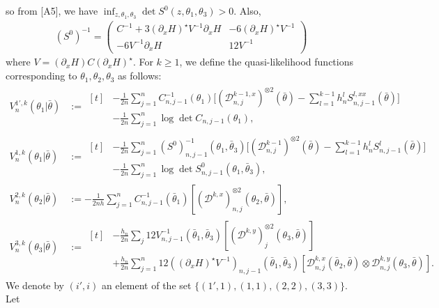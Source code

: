 \documentclass[a4paper,11pt]{jsarticle}
\begin{document}
so from [A5], we have $\inf_{z,\theta_1,\theta_3} \det S^0(z,\theta_1,\theta_3)>0$. Also,
\begin{align}
    (S^0)^{-1} =   \begin{pmatrix}
        C^{-1}  + 3( \partial_x H)^\star V^{-1}\partial_x H & -6 (\partial_x H)^\star V^{-1} \\ -6 V^{-1} \partial_x H & 12 V^{-1}
    \end{pmatrix}
\end{align}
where $    V = (\partial_x H) C (\partial_x H)^\star $. For $k \geq 1$, we define the quasi-likelihood functions corresponding to $\theta_1,\theta_2,\theta_3$ as follows:
\begin{align} 
V^{1',k}_n(\theta_1  | \bar{\theta}) &:= \begin{aligned}[t]
  &  -\frac{1}{2n} \sum_{j=1}^n C^{-1}_{n,j-1}(\theta_1 ) \Big[       (\mathcal{D}_{n,j}^{k-1,x})^{\otimes 2}(\bar{\theta}) -\sum_{l=1}^{k - 1} h_n^l S^{l,xx}  _{n,j-1} (\bar{\theta}) \Big] \\  & -\frac{1}{2n} \sum_{j=1}^n\log \det C_{n,j-1} (\theta_1) ,
\end{aligned}\\ 
V^{1,k}_n(\theta_1 | \bar{\theta}) & :=
\begin{aligned}[t] & -\frac{1}{2n} \sum_{j=1}^n  (S^0)^{-1}_{n,j-1}(\theta_1 ,\bar{\theta}_3) \Big[       (\mathcal{D}_{n,j}^{k -1} )^{\otimes 2}(\bar{\theta})-\sum_{l=1}^{k-1} h_n^l S^l_{n,j-1} (\bar{\theta}) \Big]  \\ & -\frac{1}{2n} \sum_{j=1}^n\log \det S^0_{n,j-1} (\theta_1,\bar{\theta}_3),
\end{aligned}\\    
V^{2,k}_n (\theta_2 | \bar{\theta}) &:= -\frac{1}{2nh} \sum_{j=1}^n C^{-1}_{n,j-1} (\bar{\theta}_1)[(\mathcal{D}^{k,x})_{n,j}^{\otimes 2} (\theta_2,\bar{\theta}) ], \\
   V^{3,k}_n(\theta_3| \bar{\theta}) &:=\begin{aligned}[t]
       &-\frac{h_n}{2n}\sum_ j 12 V^{-1}_{n,j-1} (\bar{\theta}_1,\bar{\theta}_3)[(\mathcal{D}^{k,y})^{\otimes 2 }_{j} (\theta_3,\bar{\theta})] \\ &+\frac{h_n}{2n} \sum_{j=1}^n 12 ((\partial_x H)^\star V^{-1})_{n,j-1} (\bar{\theta}_1,\bar{\theta}_3)[\mathcal{D}^{k,x}_{n,j}(\bar{\theta}_2,\bar{\theta}) \otimes \mathcal{D}_{n,j}^{k,y}(\theta_3,\bar{\theta}) ].
   \end{aligned} 
\end{align}
We denote by $(i',i)$ an element of the set $\{(1',1),(1,1),(2,2),(3,3)\}$. Let
\end{document}
